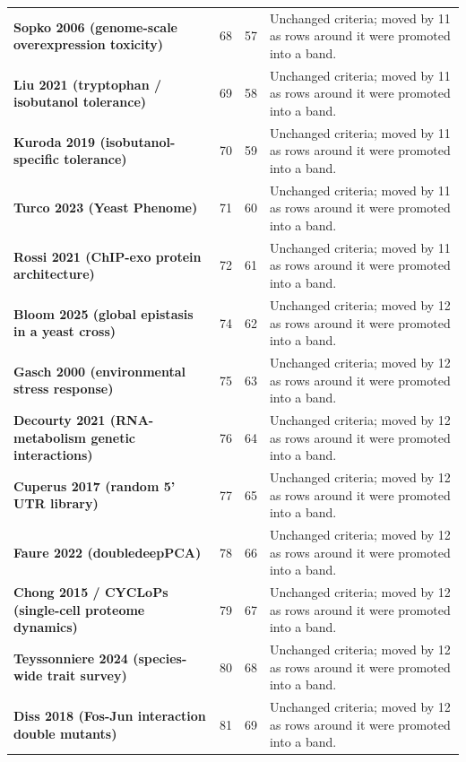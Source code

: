 \begin{longtable}{@{}L{46mm} r@{\hspace{6pt}} r@{\hspace{6pt}} L{104mm}@{}}
\addlinespace[5pt]
\textbf{Sopko 2006 (genome-scale overexpression toxicity)} & 68 & 57 & Unchanged criteria; moved by 11 as rows around it were promoted into a band. \\
\addlinespace[5pt]
\textbf{Liu 2021 (tryptophan / isobutanol tolerance)} & 69 & 58 & Unchanged criteria; moved by 11 as rows around it were promoted into a band. \\
\addlinespace[5pt]
\textbf{Kuroda 2019 (isobutanol-specific tolerance)} & 70 & 59 & Unchanged criteria; moved by 11 as rows around it were promoted into a band. \\
\addlinespace[5pt]
\textbf{Turco 2023 (Yeast Phenome)} & 71 & 60 & Unchanged criteria; moved by 11 as rows around it were promoted into a band. \\
\addlinespace[5pt]
\textbf{Rossi 2021 (ChIP-exo protein architecture)} & 72 & 61 & Unchanged criteria; moved by 11 as rows around it were promoted into a band. \\
\addlinespace[5pt]
\textbf{Bloom 2025 (global epistasis in a yeast cross)} & 74 & 62 & Unchanged criteria; moved by 12 as rows around it were promoted into a band. \\
\addlinespace[5pt]
\textbf{Gasch 2000 (environmental stress response)} & 75 & 63 & Unchanged criteria; moved by 12 as rows around it were promoted into a band. \\
\addlinespace[5pt]
\textbf{Decourty 2021 (RNA-metabolism genetic interactions)} & 76 & 64 & Unchanged criteria; moved by 12 as rows around it were promoted into a band. \\
\addlinespace[5pt]
\textbf{Cuperus 2017 (random 5' UTR library)} & 77 & 65 & Unchanged criteria; moved by 12 as rows around it were promoted into a band. \\
\addlinespace[5pt]
\textbf{Faure 2022 (doubledeepPCA)} & 78 & 66 & Unchanged criteria; moved by 12 as rows around it were promoted into a band. \\
\addlinespace[5pt]
\textbf{Chong 2015 / CYCLoPs (single-cell proteome dynamics)} & 79 & 67 & Unchanged criteria; moved by 12 as rows around it were promoted into a band. \\
\addlinespace[5pt]
\textbf{Teyssonniere 2024 (species-wide trait survey)} & 80 & 68 & Unchanged criteria; moved by 12 as rows around it were promoted into a band. \\
\addlinespace[5pt]
\textbf{Diss 2018 (Fos-Jun interaction double mutants)} & 81 & 69 & Unchanged criteria; moved by 12 as rows around it were promoted into a band. \\

\end{longtable}
